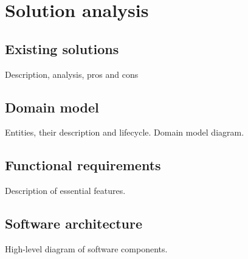 
\chapter{Solution analysis}\label{ch:solution-analysis}


\section{Existing solutions}\label{sec:existing-solutions}
{\color{gray} Description, analysis, pros and cons}


\section{Domain model}\label{sec:domain-model}
{\color{gray} Entities, their description and lifecycle. Domain model diagram.}


\section{Functional requirements}\label{sec:functional-requirements}
{\color{gray} Description of essential features.}


\section{Software architecture}\label{sec:software-architecture}
{\color{gray} High-level diagram of software components.}